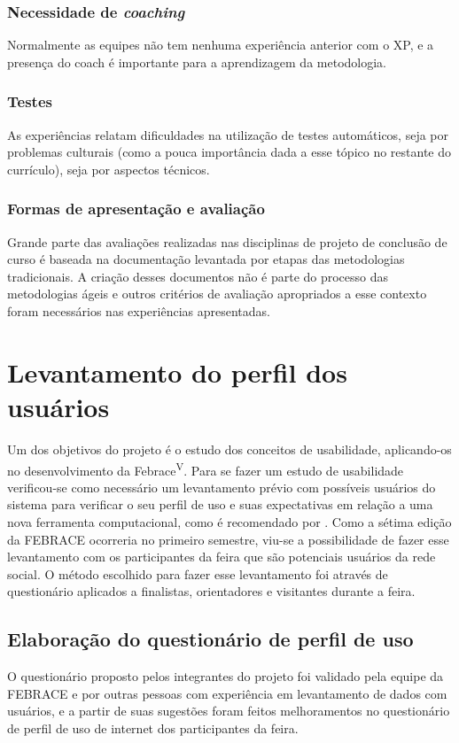     \subsubsection{Necessidade de \textit{coaching}}
      Normalmente as equipes não tem nenhuma experiência anterior com o XP, e a presença do coach é importante para a aprendizagem da metodologia.

    \subsubsection{Testes}
      As experiências relatam dificuldades na utilização de testes automáticos, seja por problemas culturais (como a pouca importância dada a esse tópico no restante do currículo), seja por aspectos técnicos.

    \subsubsection{Formas de apresentação e avaliação}
      Grande parte das avaliações realizadas nas disciplinas de projeto de conclusão de curso é baseada na documentação levantada por etapas das metodologias tradicionais. A criação desses documentos não é parte do processo das metodologias ágeis e outros critérios de avaliação apropriados a esse contexto foram necessários nas experiências apresentadas.

\section{Levantamento do perfil dos usuários}
  Um dos objetivos do projeto é o estudo dos conceitos de usabilidade, aplicando-os no desenvolvimento da Febrace\textsuperscript{V}. Para se fazer um estudo de usabilidade verificou-se como necessário um levantamento prévio com possíveis usuários do sistema para verificar o seu perfil de uso e suas expectativas em relação a uma nova ferramenta computacional, como é recomendado por . Como a sétima edição da FEBRACE ocorreria no primeiro semestre, viu-se a possibilidade de fazer esse levantamento com os participantes da feira que são potenciais usuários da rede social. O método escolhido para fazer esse levantamento foi através de questionário aplicados a finalistas, orientadores e visitantes durante a feira.

  \subsection{Elaboração do questionário de perfil de uso}
    O questionário proposto pelos integrantes do projeto foi validado pela equipe da FEBRACE e por outras pessoas com experiência em levantamento de dados com usuários, e a partir de suas sugestões foram feitos melhoramentos no questionário de perfil de uso de internet dos participantes da feira.

